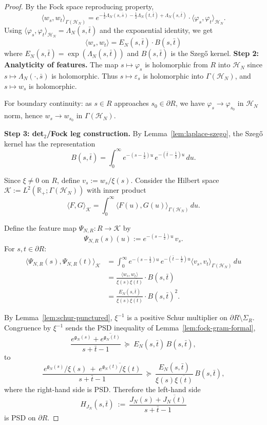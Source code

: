 \documentclass[11pt]{article}
\theoremstyle{definition}
\theoremstyle{remark}
\begin{document}
\begin{proof}
By the Fock space reproducing property,
\[
  \langle w_s, w_t \rangle_{\Gamma(\mathcal{H}_N)} = e^{-\frac{1}{2}\Lambda_N(s,\bar s) - \frac{1}{2}\Lambda_N(t,\bar t) + \Lambda_N(s,\bar t)} \cdot \langle \varphi_s, \varphi_t \rangle_{\mathcal{H}_N}.
\]
Using $\langle \varphi_s, \varphi_t \rangle_{\mathcal{H}_N} = \Lambda_N(s,\bar t)$ and the exponential identity, we get
\[
  \langle w_s, w_t \rangle = E_N(s,\bar t) \cdot B(s,\bar t)
\]
where $E_N(s,\bar t) = \exp(\Lambda_N(s,\bar t))$ and $B(s,\bar t)$ is the Szegő kernel.
\medskip
\noindent\textbf{Step 2: Analyticity of features.}
The map $s \mapsto \varphi_s$ is holomorphic from $R$ into $\mathcal{H}_N$ since $s \mapsto \Lambda_N(\cdot, \bar s)$ is holomorphic. Thus $s \mapsto \varepsilon_s$ is holomorphic into $\Gamma(\mathcal{H}_N)$, and $s \mapsto w_s$ is holomorphic.

For boundary continuity: as $s \in R$ approaches $s_0 \in \partial R$, we have $\varphi_s \to \varphi_{s_0}$ in $\mathcal{H}_N$ norm, hence $w_s \to w_{s_0}$ in $\Gamma(\mathcal{H}_N)$.

\medskip
\noindent\textbf{Step 3: det$_2$/Fock leg construction.}
By Lemma~\ref{lem:laplace-szego}, the Szegő kernel has the representation
\[
  B(s,\bar t) = \int_0^\infty e^{-(s-\frac{1}{2})u} \, e^{-(\bar t - \frac{1}{2})u} \, du.
\]

Since $\xi \neq 0$ on $R$, define $v_s := w_s / \xi(s)$. Consider the Hilbert space $\mathcal{K} := L^2(\mathbb{R}_+; \Gamma(\mathcal{H}_N))$ with inner product
\[
  \langle F, G \rangle_{\mathcal{K}} = \int_0^\infty \langle F(u), G(u) \rangle_{\Gamma(\mathcal{H}_N)} \, du.
\]

Define the feature map $\Psi_{N,R}: R \to \mathcal{K}$ by
\[
  \Psi_{N,R}(s)(u) := e^{-(s-\frac{1}{2})u} \, v_s.
\]
For $s,t \in \partial R$:
\begin{align}
  \langle \Psi_{N,R}(s), \Psi_{N,R}(t) \rangle_{\mathcal{K}} 
  &= \int_0^\infty e^{-(s-\frac{1}{2})u} \, e^{-(\bar t - \frac{1}{2})u} \langle v_s, v_t \rangle_{\Gamma(\mathcal{H}_N)} \, du\\
  &= \frac{\langle w_s, w_t \rangle}{\xi(s)\overline{\xi(t)}} \cdot B(s,\bar t)\\
  &= \frac{E_N(s,\bar t)}{\xi(s)\overline{\xi(t)}} \cdot B(s,\bar t)^2.
\end{align}

By Lemma~\ref{lem:schur-punctured}, \(\xi^{-1}\) is a positive Schur multiplier on \(\partial R \setminus \Sigma_R\). Congruence by \(\xi^{-1}\) sends the PSD inequality of Lemma~\ref{lem:fock-gram-formal},
\[
  \frac{e^{\mathfrak g_N(s)}+\overline{e^{\mathfrak g_N(t)}}}{s+\bar t-1}\ \succeq\ E_N(s,\bar t)\,B(s,\bar t),
\]
to
\[
  \frac{\,e^{\mathfrak g_N(s)}/\xi(s)\ +\ \overline{e^{\mathfrak g_N(t)}/\xi(t)}\,}{s+\bar t-1}\ \succeq\ \frac{E_N(s,\bar t)}{\xi(s)\overline{\xi(t)}}\,B(s,\bar t),
\]
where the right-hand side is PSD. Therefore the left-hand side
\[
  H_{J_N}(s,\bar t)\ :=\ \frac{J_N(s)+\overline{J_N(t)}}{s+\bar t-1}
\]
is PSD on \(\partial R\).


\end{proof}
\end{document}
